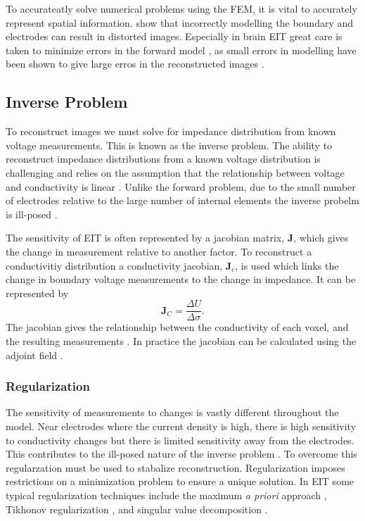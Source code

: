 To accurateatly solve numerical problems using the FEM, it is vital to accurately represent 
spatial information.  show that incorrectly modelling 
the boundary and electrodes can result in distorted images. 
Especially in brain EIT great care is taken to minimize errors in the forward model 
\parencite{aristovich_method_2014,malone_multifrequency_2014}, 
as small errors
in modelling have been shown to give large erros in the reconstructed 
images \parencite{kolehmainen_assessment_1997}. 

\subsection{Inverse Problem}
To reconstruct images we must solve for impedance distribution from known voltage measurements. 
This is known as the inverse problem. 
The ability to reconstruct impedance distributions from a known voltage distribution is challenging 
and relies on the assumption that the relationship between voltage and conductivity is 
linear \parencite{barber_applied_1984}.
Unlike the forward problem, due to the small number of electrodes 
relative to the large number of internal elements the inverse probelm is
ill-posed \parencite{holder_electrical_2004}.

The sensitivity of EIT is often represented by a jacobian matrix, $\mathbf{J}$,
which gives the change in measurement relative to another factor. To reconstruct 
a conductivitiy distribution a conductivity jacobian, $\mathbf{J}_c$, is used
which links the change 
in boundary voltage measurements to the change in impedance. It can be represented by 
\begin{equation} \label{eq:jacobian_c}
	\mathbf{J}_C = \frac{\Delta U}{\Delta \sigma}. 
\end{equation}
The jacobian gives the relationship between the conductivity of each voxel, and the resulting
measurements \parencite{holder_electrical_2004}.
In practice the jacobian can be calculated using the adjoint 
field \parencite{vauhkonen_three-dimensional_1999}. 

\subsubsection{Regularization}
The sensitivity of measurements to changes is vastly different throughout the model. 
Near electrodes where the current density is high, there is high sensitivity to conductivity 
changes but there is limited sensitivity away from the electrodes. This contributes 
to the ill-posed nature of the inverse problem \parencite{holder_electrical_2004}.
To overcome this regularzation must be used to stabalize reconstruction. 
Regularization imposes restrictions on a minimization problem to ensure a unique solution.
In EIT some typical regularization techniques include the maximum \emph{a priori} approach
\parencite{adler_electrical_1996}, Tikhonov regularization \parencite{vauhkonen_tikhonov_1998},
and singular value decomposition \parencite{ostebee_rank-deficient_1998}.

